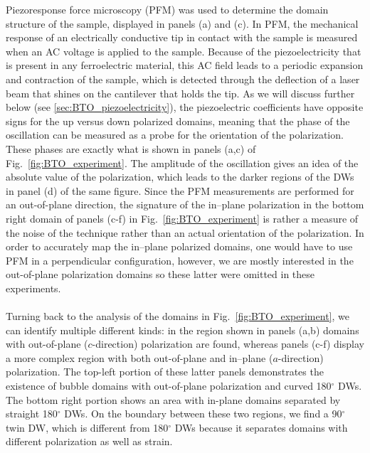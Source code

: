 Piezoresponse force microscopy (PFM)\cite{Harnagea2001} was used to determine the domain structure of the sample, displayed in panels (a) and (c).
In PFM, the mechanical response of an electrically conductive tip in contact with the sample is measured when an AC voltage is applied to the sample.
Because of the piezoelectricity that is present in any ferroelectric material, this AC field leads to a periodic expansion and contraction of the sample, which is detected through the deflection of a laser beam that shines on the cantilever that holds the tip.
As we will discuss further below (see \ref{sec:BTO_piezoelectricity}), the piezoelectric coefficients have opposite signs for the up versus down polarized domains, meaning that the phase of the oscillation can be measured as a probe for the orientation of the polarization.
These phases are exactly what is shown in panels (a,c) of Fig.~\ref{fig:BTO_experiment}. The amplitude of the oscillation gives an idea of the absolute value of the polarization, which leads to the darker regions of the DWs in panel (d) of the same figure.
Since the PFM measurements are performed for an out-of-plane direction, the signature of the in--plane polarization in the bottom right domain of panels (c-f) in Fig.~\ref{fig:BTO_experiment} is rather a measure of the noise of the technique rather than an actual orientation of the polarization.
In order to accurately map the in--plane polarized domains, one would have to use PFM in a perpendicular configuration, however, we are mostly interested in the out-of-plane polarization domains so these latter were omitted in these experiments.
\\\\
Turning back to the analysis of the domains in Fig.~\ref{fig:BTO_experiment}, we can identify multiple different kinds: in the region shown in panels (a,b) domains with out-of-plane ($c$-direction) polarization are found, whereas panels (c-f) display a more complex region with both out-of-plane and in--plane ($a$-direction) polarization.
The top-left portion of these latter panels demonstrates the existence of bubble domains with out-of-plane polarization and curved 180$^\circ$ DWs.
The bottom right portion shows an area with in-plane domains separated by straight 180$^\circ$ DWs.
On the boundary between these two regions, we find a 90$^\circ$ twin DW, which is different from 180$^\circ$ DWs because it separates domains with different polarization as well as strain.

